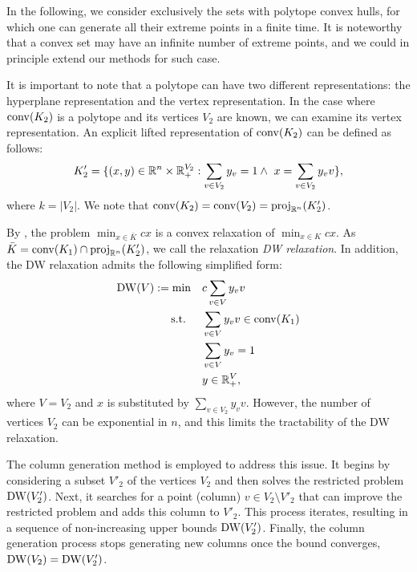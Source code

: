 In the following, we consider exclusively the sets with  polytope convex hulls, for which one can generate all their extreme points in a finite time. It is noteworthy that a convex set may have an infinite number of extreme points, and we could in principle extend our methods for such case.

It is important to note that a polytope can have two different representations: the hyperplane representation and the vertex representation. In the case where $\operatorname{conv}(K_2)$ is a polytope and its vertices $V_2$ are known, we can examine its vertex representation. An explicit lifted representation of $\operatorname{conv}(K_2)$ can be defined as follows:
\begin{equation}
    K'_2 = \{(x,y) \in \mathbb R^n \times \mathbb R^{V_2}_+: \sum_{v \in V_2} y_v = 1 \land \ x = \sum_{v \in V_2}  y_v v\},
\end{equation}
where $k = |V_2|$. We note that $\operatorname{conv}(K_2) = \operatorname{conv}(V_2) = \operatorname{proj}_{\mathbb R^n}(K'_2)$. 


By , the problem $\min_{x \in \bar{K}} cx$ is a convex relaxation of $\min_{x \in K} cx$. As  $ \bar{K} =\operatorname{conv}(K_1) \cap  \operatorname{proj}_{\mathbb R^n}(K'_2)$, we call the relaxation \emph{DW relaxation}. In addition, the DW relaxation admits the following simplified form:
 \begin{subequations}
    \label{dwrel}
    \begin{align}
       \operatorname{DW}(V):=\min &  \quad c \sum_{v \in V}  y_v v  \\
    \textup{ s.t. } &  \quad  \sum_{v \in V}  y_v v  \in \operatorname{conv}(K_1) \\
       &  \quad  \sum_{v \in V} y_v = 1\\
      & \quad y \in \mathbb R^{V}_+,
    \end{align}
\end{subequations}
where $V = V_2$ and $x$ is substituted by $\sum_{v \in V_2}  y_v v$. 
However, the number of vertices $V_2$ can be exponential in $n$, and this limits the tractability  of the DW relaxation. 


The column generation method \cite{barnhart1998branch,Vanderbeck2010} is employed to address this issue. It begins by considering a subset $V'_2$ of the vertices $V_2$ and then solves the restricted problem $\operatorname{DW}(V'_2)$. Next, it searches for a point (column) $v \in V_2 \setminus V'_2$ that can improve the restricted problem and adds this column to $V'_2$. This process iterates, resulting in a sequence of non-increasing upper bounds $\operatorname{DW}(V'_2)$. Finally, the column generation process stops generating new columns once the bound converges, \ie $\operatorname{DW}(V_2) = \operatorname{DW}(V'_2)$.


